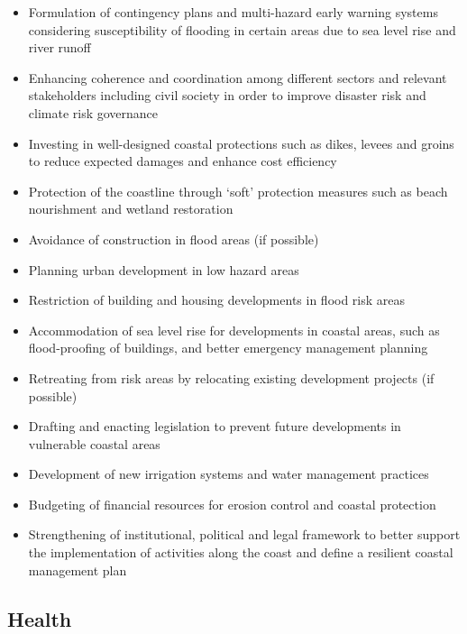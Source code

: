 \documentclass[
]{book}
\providecommand{\tightlist}{%
  \setlength{\itemsep}{0pt}\setlength{\parskip}{0pt}}
\begin{document}
\begin{itemize}
\tightlist
\item
  Formulation of contingency plans and multi-hazard early warning systems considering susceptibility of flooding in certain areas due to sea level rise and river runoff
\item
  Enhancing coherence and coordination among different sectors and relevant stakeholders including civil society in order to improve disaster risk and climate risk governance
\item
  Investing in well-designed coastal protections such as dikes, levees and groins to reduce expected damages and enhance cost efficiency
\item
  Protection of the coastline through `soft' protection measures such as beach nourishment and wetland restoration
\item
  Avoidance of construction in flood areas (if possible)
\item
  Planning urban development in low hazard areas
\item
  Restriction of building and housing developments in flood risk areas
\item
  Accommodation of sea level rise for developments in coastal areas, such as flood-proofing of buildings, and better emergency management planning
\item
  Retreating from risk areas by relocating existing development projects (if possible)
\item
  Drafting and enacting legislation to prevent future developments in vulnerable coastal areas
\item
  Development of new irrigation systems and water management practices
\item
  Budgeting of financial resources for erosion control and coastal protection
\item
  Strengthening of institutional, political and legal framework to better support the implementation of activities along the coast and define a resilient coastal management plan
\end{itemize}

\hypertarget{health}{%
\subsection{Health}\label{health}}
\end{document}
